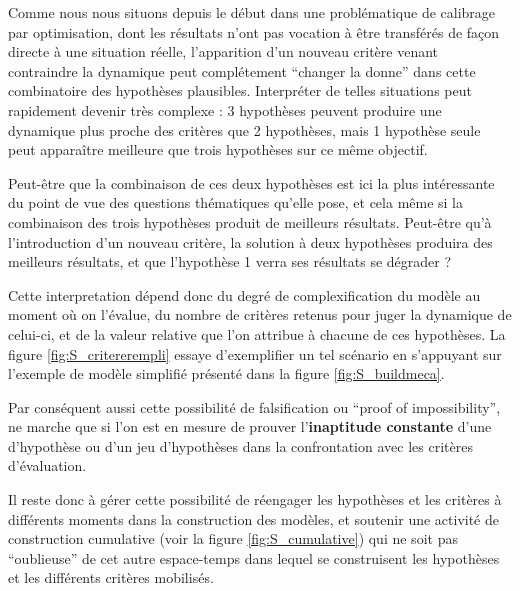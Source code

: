 Comme nous nous situons depuis le début dans une problématique de calibrage par optimisation, dont les résultats n'ont pas vocation à être transférés de façon directe à une situation réelle, l'apparition d'un nouveau critère venant contraindre la dynamique peut complétement \enquote{changer la donne} dans cette combinatoire des hypothèses plausibles. Interpréter de telles situations peut rapidement devenir très complexe : 3 hypothèses peuvent produire une dynamique plus proche des critères que 2 hypothèses, mais 1 hypothèse seule peut apparaître meilleure que trois hypothèses sur ce même objectif.

Peut-être que la combinaison de ces deux hypothèses est ici la plus intéressante du point de vue des questions thématiques qu'elle pose, et cela même si la combinaison des trois hypothèses produit de meilleurs résultats. Peut-être qu'à l'introduction d'un nouveau critère, la solution à deux hypothèses produira des meilleurs résultats, et que l'hypothèse 1 verra ses résultats se dégrader ?

Cette interpretation dépend donc du degré de complexification du modèle au moment où on l'évalue, du nombre de critères retenus pour juger la dynamique de celui-ci, et de la valeur relative que l'on attribue à chacune de ces hypothèses. La figure \ref{fig:S_critererempli} essaye d'exemplifier un tel scénario en s'appuyant sur l'exemple de modèle simplifié présenté dans la figure \ref{fig:S_buildmeca}.

Par conséquent aussi cette possibilité de falsification ou \foreignquote{english}{proof of impossibility}, ne marche que si l'on est en mesure de prouver l'\textbf{inaptitude constante} d'une d'hypothèse ou d'un jeu d'hypothèses dans la confrontation avec les critères d’évaluation.

Il reste donc à gérer cette possibilité de réengager les hypothèses et les critères à différents moments dans la construction des modèles, et soutenir une activité de construction cumulative (voir la figure \ref{fig:S_cumulative}) qui ne soit pas \enquote{oublieuse} de cet autre espace-temps dans lequel se construisent les hypothèses et les différents critères mobilisés.
